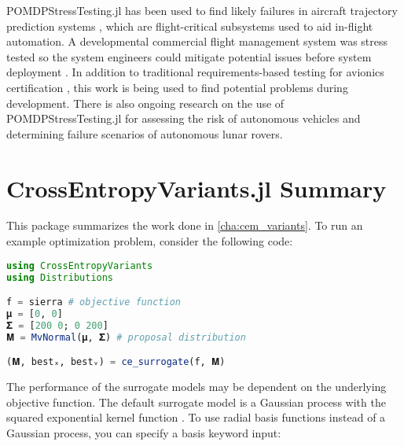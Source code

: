 POMDPStressTesting.jl has been used to find likely failures in aircraft trajectory prediction systems \cite{ast_fms}, which are flight-critical subsystems used to aid in-flight automation.
A developmental commercial flight management system was stress tested so the system engineers could mitigate potential issues before system deployment \cite{ast_fms}.
In addition to traditional requirements-based testing for avionics certification \cite{do178c}, this work is being used to find potential problems during development.
There is also ongoing research on the use of POMDPStressTesting.jl for assessing the risk of autonomous vehicles and determining failure scenarios of autonomous lunar rovers. 





\section{CrossEntropyVariants.jl Summary}

This package summarizes the work done in \cref{cha:cem_variants}.
To run an example optimization problem, consider the following code:

\begin{lstlisting}[language=Julia]
using CrossEntropyVariants
using Distributions

f = sierra # objective function
𝛍 = [0, 0]
𝚺 = [200 0; 0 200]
𝐌 = MvNormal(𝛍, 𝚺) # proposal distribution

(𝐌, bestₓ, bestᵥ) = ce_surrogate(f, 𝐌)
\end{lstlisting}

The performance of the surrogate models may be dependent on the underlying objective function. The default surrogate model is a Gaussian process with the squared exponential kernel function \cite{kochenderfer2019algorithms}. To use radial basis functions instead of a Gaussian process, you can specify a basis keyword input:

